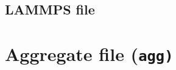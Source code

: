 \begin{comment}
Block (i) starts with a line:
\begin{verbatim}beads <beads>\end{verbatim}
where \tt{<beads>} is the number of beads in the molecule. Following are
\tt{<beads>} lines for each bead:
\begin{verbatim}<name> <x> <y> <z>\end{verbatim}
where \tt{<name>} is a bead name that must be present in the \tt{<species>}
section and \tt{<x>}, \tt{<y>}, and \tt{<z>} are Cartesian coordinates.

Block (ii) starts with a line:
\begin{verbatim}bonds <n>\end{verbatim}
where \tt{<n>} is the number of bonds in the molecule. Following are
\tt{<n>} lines for each bond:
\begin{verbatim}harm <l> <m> <k> <r>\end{verbatim}
where \tt{<l>} and \tt{<m>} are bead indices of connected beads that run
from 1 to \tt{<beads>} and \tt{<k>} and \tt{<r>} are the strength and
equilibrium distance, respectively, of a harmonic oscillator (AnalysisTools
assumes bonds use harmonic potential).

Block (iii) starts with a line:
\begin{verbatim}angles <n>\end{verbatim}
where \tt{<n>} is the number of angles in the molecule. Following are
\tt{<n>} lines for each angle:
\begin{verbatim}harm <l> <m> <n> <k> <alpha>\end{verbatim}
where \tt{<l>}, \tt{<m>}, and \tt{<n>} are bead indices defining the angle
that run from 1 to \tt{<beads>} and \tt{<k>} and \tt{<alpha>} are the
strength and equilibrium angle, respectively, of a harmonic oscillator
(AnalysisTools assumes angles use harmonic potential). This block is optional.

Anything between the last angle line and the \tt{finish} keyword is ignored.

Several examples of a \field file can be found in the \tt{Examples}
directory, e.g., in \tt{Examples/AddToSystem}.
\end{comment}

\subsection{LAMMPS \data file} %

\section{Aggregate file (\tt{agg})} \label{ssec:AggFile} %

